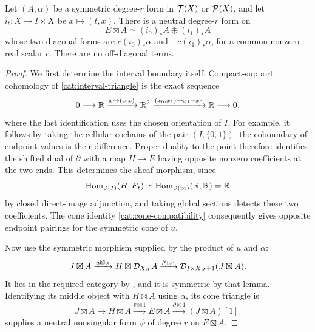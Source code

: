 \begin{lemma}
\label{cat:endpoint-forms}
Let $(A,\alpha)$ be a symmetric degree-$r$ form in $\mathcal T(X)$ or
$\mathcal P(X)$, and let $i_t:X\to I\times X$ be $x\mapsto(t,x)$.
There is a neutral degree-$r$ form on
\[
 E\boxtimes A\simeq(i_0)_*A\oplus(i_1)_*A
\]
whose two diagonal forms are $c(i_0)_*\alpha$ and
$-c(i_1)_*\alpha$, for a common nonzero real scalar $c$.  There are no
off-diagonal terms.
\end{lemma}

\begin{proof}
We first determine the interval boundary itself.  Compact-support
cohomology of \eqref{cat:interval-triangle} is the exact sequence
\begin{equation}
 \label{cat:interval-cohomology}
 0\longrightarrow\mathbb R
 \xrightarrow{x\mapsto(x,x)}\mathbb R^2
 \xrightarrow{(x_0,x_1)\mapsto x_1-x_0}\mathbb R
 \longrightarrow0,
\end{equation}
where the last identification uses the chosen orientation of $I$.
For example, it follows by taking the cellular cochains of the pair
$(I,\{0,1\})$: the coboundary of endpoint values is their difference.
Proper duality to the point therefore identifies the shifted dual of
$\partial$ with a map $H\to E$ having opposite nonzero coefficients
at the two ends.  This determines the sheaf morphism, since
\[
 \operatorname{Hom}_{\mathsf D(I)}(H,E_t)
 \simeq\operatorname{Hom}_{\mathsf D(\mathrm{pt})}(\mathbb R,\mathbb R)=\mathbb R
\]
by closed direct-image adjunction, and taking global sections detects
these two coefficients.  The cone identity
\eqref{cat:cone-compatibility} consequently gives opposite endpoint
pairings for the symmetric cone of $u$.

Now use the symmetric morphism supplied by the product of $u$ and
$\alpha$:
\begin{equation}
 \label{cat:cylinder-morphism}
 J\boxtimes A
 \xrightarrow{u\boxtimes\alpha}
 H\boxtimes\mathcal D_{X,r}A
 \xrightarrow{\mu_{1,r}}
 \mathcal D_{I\times X,r+1}(J\boxtimes A).
\end{equation}
It lies in the required category by
, and it is symmetric by that lemma.
Identifying its middle object with $H\boxtimes A$ using $\alpha$,
its cone triangle is
\[
 J\boxtimes A\longrightarrow H\boxtimes A
 \xrightarrow{v\boxtimes1}E\boxtimes A
 \xrightarrow{\partial\boxtimes1}(J\boxtimes A)[1].
\]
 supplies a neutral nonsingular form $\psi$
of degree $r$ on $E\boxtimes A$.


\end{proof}
